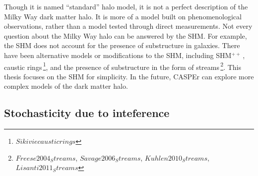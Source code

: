 Though it is named ``standard'' halo model, it is not a perfect description of the Milky Way dark matter halo. It is more of a model built on phenomenological observations, rather than a model tested through direct measurements. 
Not every question about the Milky Way halo can be answered by the SHM. For example, the SHM does not account for the presence of substructure in galaxies. 
There have been alternative models or modifications to the SHM, including SHM$^{++}$\,\cite{Evans2019_SHMRefined}, caustic rings\,\footnote{$Sikivie caustic rings$}, and the presence of substructure in the form of streams\,\footnote{$Freese2004_Streams$, $Savage2006_Streams$, $Kuhlen2010_Streams$, $Lisanti2011_Streams$}. 
This thesis focuses on the SHM for simplicity. 
In the future, CASPEr can explore more complex models of the dark matter halo. 




\subsection{Stochasticity due to inteference}\label{sec:theory:MWALP:stochasticity}

